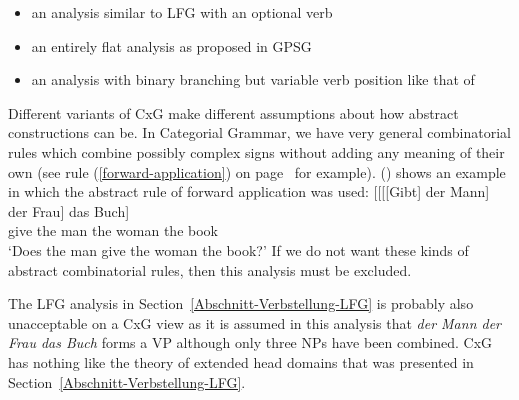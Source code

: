 \begin{itemize}
\item an analysis similar to LFG with an optional verb
\item  an entirely flat analysis as proposed in GPSG
\item an analysis with binary branching but variable verb position like that of \citet[]{Steedman2000a-u}
\end{itemize}
%
Different variants of CxG make different assumptions about how abstract constructions can be.
In Categorial Grammar, we have very general combinatorial rules which combine possibly complex signs without adding any meaning
of their own (see rule (\ref{forward-application}) on page~\pageref{forward-application} for
example). () shows an example in which the abstract rule of forward application was used:
\ea
\gll {}[[[[Gibt] der Mann] der Frau] das Buch]\\
	 {}\spacebr{}\spacebr{}\spacebr{}\spacebr{}give the man the woman the book\\
\glt `Does the man give the woman the book?'
\z
If we do not want these kinds of abstract combinatorial rules, then this analysis must be excluded.

The LFG analysis in Section~\ref{Abschnitt-Verbstellung-LFG} is probably also unacceptable on a CxG view as it is assumed in this analysis
that \emph{der Mann der Frau das
  Buch} forms a VP although only three NPs have been combined. CxG has nothing like the theory of extended head domains that was presented in 
  Section~\ref{Abschnitt-Verbstellung-LFG}.

